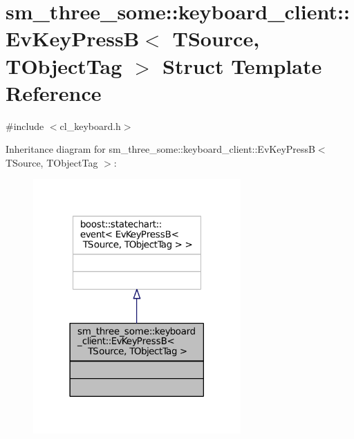 \hypertarget{structsm__three__some_1_1keyboard__client_1_1EvKeyPressB}{}\section{sm\+\_\+three\+\_\+some\+:\+:keyboard\+\_\+client\+:\+:Ev\+Key\+PressB$<$ T\+Source, T\+Object\+Tag $>$ Struct Template Reference}
\label{structsm__three__some_1_1keyboard__client_1_1EvKeyPressB}


{\ttfamily \#include $<$cl\+\_\+keyboard.\+h$>$}



Inheritance diagram for sm\+\_\+three\+\_\+some\+:\+:keyboard\+\_\+client\+:\+:Ev\+Key\+PressB$<$ T\+Source, T\+Object\+Tag $>$\+:
\nopagebreak
\begin{figure}[H]
\begin{center}
\leavevmode
\includegraphics[width=225pt]{structsm__three__some_1_1keyboard__client_1_1EvKeyPressB__inherit__graph}
\end{center}
\end{figure}


